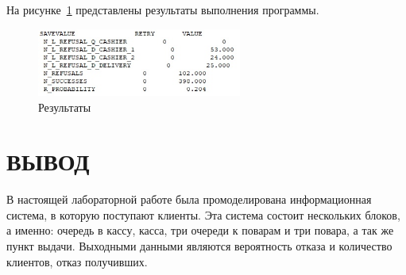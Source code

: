 На рисунке~\ref{img:results} представлены результаты выполнения программы.
\begin{figure}[H]
    \centering
    \includegraphics[width=0.6\textwidth]{images/scr01.jpg}
    \caption{Результаты}
    \label{img:results}
\end{figure}

\section*{\hfill{}ВЫВОД\hfill{}}
В настоящей лабораторной работе была промоделирована информационная система, в которую поступают клиенты. Эта система состоит нескольких блоков, а именно: очередь в кассу, касса, три очереди к поварам и три повара, а так же пункт выдачи. Выходными данными являются вероятность отказа и количество клиентов, отказ получивших.
